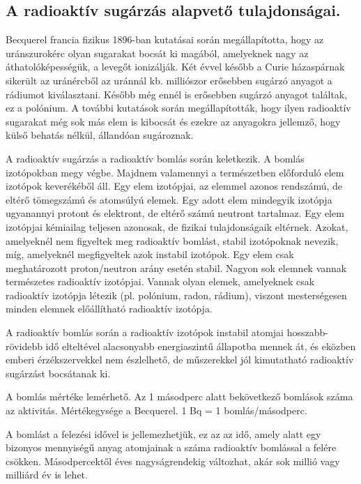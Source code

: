 \subsection{A radioaktív sugárzás alapvető tulajdonságai.}
Becquerel francia fizikus 1896-ban kutatásai során megállapította, hogy az uránszurokérc olyan sugarakat bocsát ki magából, amelyeknek nagy az áthatolóképességük, a levegőt ionizálják. Két évvel később a Curie házaspárnak sikerült az uránércből az uránnál kb. milliószor erősebben sugárzó anyagot a rádiumot kiválasztani. Később még ennél is erősebben sugárzó anyagot találtak, ez a polónium. A további kutatások során megállapították, hogy ilyen radioaktív sugarakat még sok más elem is kibocsát és ezekre az anyagokra jellemző, hogy külső behatás nélkül, állandóan sugároznak.

A radioaktív sugárzás a radioaktív bomlás során keletkezik. A bomlás izotópokban megy végbe. Majdnem valamennyi a természetben előforduló elem izotópok keverékéből áll. Egy elem izotópjai, az elemmel azonos rendszámú, de eltérő tömegszámú és atomsúlyú elemek. Egy adott elem mindegyik izotópja ugyanannyi protont és elektront, de eltérő számú neutront tartalmaz. Egy elem izotópjai kémiailag teljesen azonosak, de fizikai tulajdonságaik eltérnek. Azokat, amelyeknél nem figyeltek meg radioaktív bomlást, stabil izotópoknak nevezik, míg, amelyeknél megfigyeltek azok instabil izotópok. Egy elem csak meghatározott proton/neutron arány esetén stabil. Nagyon sok elemnek vannak természetes radioaktív izotópjai. Vannak olyan elemek, amelyeknek csak radioaktív izotópja létezik (pl. polónium, radon, rádium), viszont mesterségesen minden elemnek előállítható radioaktív izotópja.

A radioaktív bomlás során a radioaktív izotópok instabil atomjai hosszabb-rövidebb idő elteltével alacsonyabb energiaszintű állapotba mennek át, és eközben emberi érzékszervekkel nem észlelhető, de műszerekkel jól kimutatható radioaktív sugárzást bocsátanak ki.

A bomlás mértéke lemérhető. Az 1 másodperc alatt bekövetkező bomlások száma az aktivitás. Mértékegysége a Becquerel. 1 Bq = 1 bomlás/másodperc.

A bomlást a felezési idővel is jellemezhetjük, ez az az idő, amely alatt egy bizonyos mennyiségű anyag atomjainak a száma radioaktív bomlással a felére csökken. Másodpercektől éves nagyságrendekig változhat, akár sok millió vagy milliárd év is lehet.

